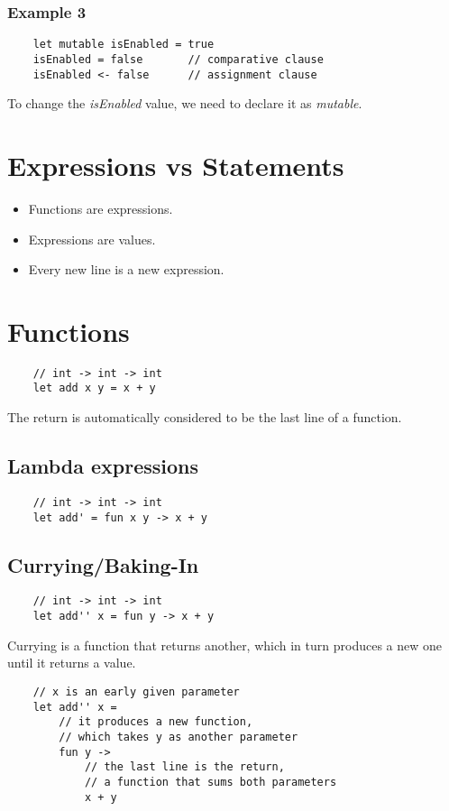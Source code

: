 \documentclass[a4paper,11pt]{article}
\begin{document}
\subsubsection*{Example 3}
\begin{lstlisting}
    let mutable isEnabled = true
    isEnabled = false       // comparative clause
    isEnabled <- false      // assignment clause
\end{lstlisting}
To change the \textit{isEnabled} value, we need to declare it as \textit{mutable}.

\section{Expressions vs Statements}
\begin{itemize}
    \item Functions are expressions.
    \item Expressions are values.
    \item Every new line is a new expression.
\end{itemize}

\section{Functions}
\begin{lstlisting}
    // int -> int -> int
    let add x y = x + y 
\end{lstlisting}
The return is automatically considered to be the last line of a function.

\subsection{Lambda expressions}
\begin{lstlisting}
    // int -> int -> int
    let add' = fun x y -> x + y
\end{lstlisting}

\subsection{Currying/Baking-In }
\begin{lstlisting}
    // int -> int -> int
    let add'' x = fun y -> x + y
\end{lstlisting}

Currying is a function that returns another, which in turn produces a new one until it returns a value.

\begin{lstlisting}
    // x is an early given parameter
    let add'' x =
        // it produces a new function,
        // which takes y as another parameter
        fun y ->
            // the last line is the return,
            // a function that sums both parameters
            x + y
\end{lstlisting}
\end{document}

